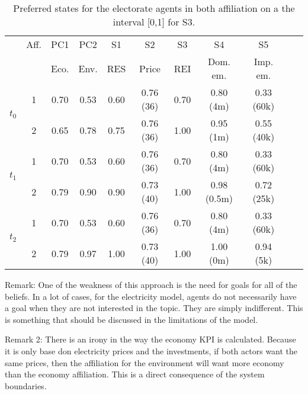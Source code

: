 \begin{table}
\begin{center}
\begin{tabular}{ |c|c|c|c|c|c|c|c|c|c|c| } 
\hline
		
			& Aff.	& PC1 	& PC2	& S1		& S2		& S3		& S4			& S5		\\ 
			&		& Eco.	& Env.	& RES	& Price	& REI	& Dom. em.	& Imp. em.	\\ \hline \hline

\multirow{2}{*}{$t_0$}
			& 1		& 0.70	& 0.53	& 0.60	& 0.76 (36)	& 0.70	& 0.80 (4m)	& 0.33 (60k)	\\ \cline{2-9}
			& 2		& 0.65	& 0.78	& 0.75	& 0.76 (36) 	& 1.00	& 0.95 (1m)	& 0.55 (40k)	\\ \hline \hline
					
\multirow{2}{*}{$t_1$}
			& 1		& 0.70	& 0.53	& 0.60	& 0.76 (36)	& 0.70	& 0.80 (4m)	& 0.33 (60k)	\\ \cline{2-9}
			& 2		& 0.79	& 0.90	& 0.90	& 0.73 (40)	& 1.00	& 0.98 (0.5m)	& 0.72 (25k)	\\ \hline \hline
					
\multirow{2}{*}{$t_2$}
			& 1		& 0.70	& 0.53	& 0.60	& 0.76 (36)	& 0.70	& 0.80 (4m)	& 0.33 (60k)	\\ \cline{2-9}
			& 2		& 0.79	& 0.97	& 1.00	& 0.73 (40)	& 1.00	& 1.00 (0m)	& 0.94 (5k)	\\

\hline
\end{tabular}
\end{center}
\caption{Preferred states for the electorate agents in both affiliation on a the interval [0,1] for S3.}
\label{tab:preferredStates_Elec_S3}
\end{table}

Remark: One of the weakness of this approach is the need for goals for all of the beliefs. In a lot of cases, for the electricity model, agents do not necessarily have a goal when they are not interested in the topic. They are simply indifferent. This is something that should be discussed in the limitations of the model.

Remark 2: There is an irony in the way the economy KPI is calculated. Because it is only base don electricity prices and the investments, if both actors want the same prices, then the affiliation for the environment will want more economy than the economy affiliation. This is a direct consequence of the system boundaries.


